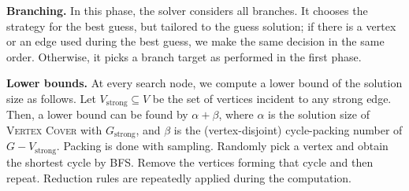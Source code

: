 \documentclass[a4paper,UKenglish,cleveref, autoref, thm-restate]{lipics-v2021}
\begin{document}
\textbf{Branching.} In this phase, the solver considers all branches.
It chooses the strategy for the best guess, but tailored to the guess solution;
 if there is a vertex or an edge used during the best guess, we make the same decision in the same order.
Otherwise, it picks a branch target as performed in the first phase.

\textbf{Lower bounds.} At every search node, we compute a lower bound of the solution size as follows.
Let $V_\text{strong} \subseteq V$ be the set of vertices incident to any strong edge.
Then, a lower bound can be found by $\alpha + \beta$,
 where $\alpha$ is the solution size of \textsc{Vertex Cover} with $G_\text{strong}$,
 and $\beta$ is the (vertex-disjoint) cycle-packing number of $G - V_\text{strong}$.
Packing is done with sampling. Randomly pick a vertex and obtain the shortest cycle by BFS.
Remove the vertices forming that cycle and then repeat.
%
Reduction rules are repeatedly applied during the computation.




\end{document}
